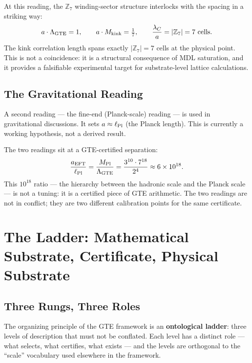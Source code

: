 \documentclass[11pt,a4paper]{article}
\newcommand{\term}[1]{\textbf{#1}}
\newcommand{\ZS}{\mathbb{Z}_7}
\newcommand{\Mkink}{M_{\rm kink}}
\theoremstyle{definition}
\begin{document}
At this reading, the $\ZS$ winding-sector structure interlocks with the spacing
in a striking way:
\[
  a \cdot \Lambda_{\rm GTE} = 1,\qquad
  a \cdot \Mkink = \tfrac{1}{7},\qquad
  \frac{\lambda_C}{a} = |\ZS| = 7 \text{ cells}.
\]
The kink correlation length spans exactly $|\ZS| = 7$ cells at the physical point.
This is not a coincidence: it is a structural consequence of MDL saturation, and
it provides a falsifiable experimental target for substrate-level lattice
calculations.

\subsection{The Gravitational Reading}

A second reading --- the fine-end (Planck-scale) reading --- is used in gravitational
discussions.  It sets $a \approx \ell_{\rm Pl}$ (the Planck length).
This is currently a working hypothesis, not a derived result.

The two readings sit at a GTE-certified separation:
\[
  \frac{a_{\rm EFT}}{\ell_{\rm Pl}}
  = \frac{M_{\rm Pl}}{\Lambda_{\rm GTE}}
  = \frac{3^{10} \cdot 7^{18}}{2^4}
  \approx 6 \times 10^{18}.
\]
This $10^{18}$ ratio --- the hierarchy between the hadronic scale and the Planck
scale --- is not a tuning: it is a certified piece of GTE arithmetic.
The two readings are not in conflict; they are two different calibration points
for the same certificate.

\section{The Ladder: Mathematical Substrate, Certificate, Physical Substrate}
\label{sec:ladder}

\subsection{Three Rungs, Three Roles}

The organizing principle of the GTE framework is an \term{ontological ladder}:
three levels of description that must not be conflated.
Each level has a distinct role --- what selects, what certifies, what exists ---
and the levels are orthogonal to the ``scale'' vocabulary used elsewhere in the
framework.
\end{document}
